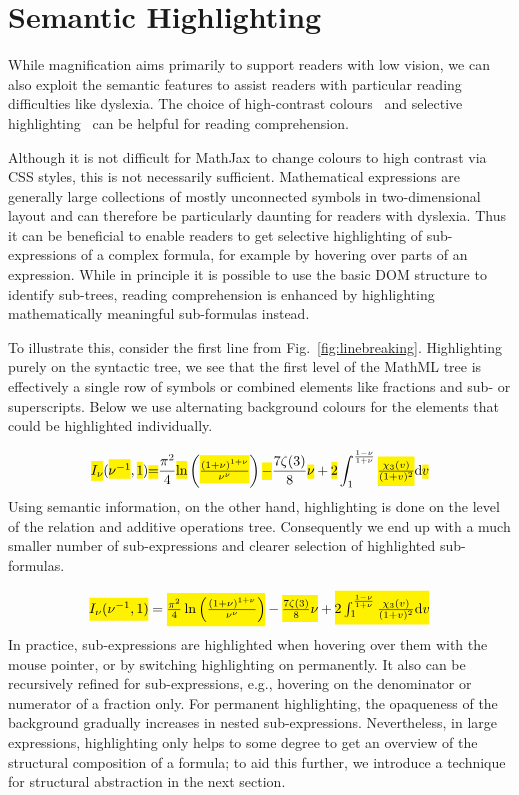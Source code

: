 \documentclass[conference]{IEEEtran}
\begin{document}
\section{Semantic Highlighting}
\label{sec:highlighting}

While magnification aims primarily to support readers with low vision, we can
also exploit the semantic features to assist readers with
particular reading difficulties like dyslexia. The choice of high-contrast
colours~\cite{rello2012optimal} and selective
highlighting~\cite{jones2008strategies} can be helpful for reading
comprehension.

Although it is not difficult for MathJax to change colours to high contrast via
CSS styles, this is not necessarily sufficient.  Mathematical expressions are
generally large collections of mostly unconnected symbols in two-dimensional
layout and can therefore be particularly daunting for readers with dyslexia.
Thus it can be beneficial to enable readers to get selective highlighting of
sub-expressions of a complex formula, for example by hovering over parts of an
expression.  While in principle it is possible to use the basic DOM 
structure to identify sub-trees, reading comprehension is enhanced by 
highlighting mathematically meaningful sub-formulas instead.

To illustrate this, consider the first line from Fig.~\ref{fig:linebreaking}.
Highlighting purely on the syntactic
tree, we see that the first level of the MathML tree is effectively a single
row of symbols or combined elements like fractions and sub- or
superscripts. Below we use alternating background colours for the elements
that could be highlighted individually.

\def\cb#1{\colorbox{yellow}{\ensuremath{\!\!#1\!\!}}}
\def\wcb#1{\colorbox{white}{\ensuremath{\!\!#1\!\!}}}
{\footnotesize
\[\cb{I_\nu}
  (
  \cb{\nu^{-1}}
  ,
  \cb{1}
  )
  \cb{=}
  \frac{\pi^2}{4}
  \cb{\ln}
  \left(
    \cb{\frac{(1+\nu)^{1+\nu}}{\nu^\nu}}
  \right)
  \cb{-}
  \frac{7\zeta(3)}{8}
  \cb{\nu}
  +
  \cb{2}
  \int^\frac{1-\nu}{1+\nu}_1
  \cb{\frac{\chi_3(v)}{(1+v)^2}}
  {\rm d}
  \cb{v}
\]
}%
%
Using semantic information, on the other hand, highlighting is done on the
level of the relation and additive operations tree. Consequently we end up with a
much smaller number of sub-expressions and clearer selection of highlighted
sub-formulas.

{\footnotesize
\[\cb{I_\nu(\nu^{-1},1)}
  =\cb{\frac{\pi^2}{4}\ln\left(\frac{(1+\nu)^{1+\nu}}{\nu^\nu}
\right)}-\cb{\frac{7\zeta(3)}{8}\nu}+
\cb{2\int^\frac{1-\nu}{1+\nu}_1\frac{\chi_3(v)}{(1+v)^2}{\rm d}v}
\]
}%
%
In practice, sub-expressions are highlighted when hovering over them with the
mouse pointer, or by switching highlighting on permanently. It also can be
recursively refined for sub-expressions, e.g., hovering on the denominator or
numerator of a fraction only. For permanent highlighting, the 
opaqueness of the background gradually increases in
nested sub-expressions. Nevertheless, in large expressions, highlighting only helps to
some degree to get an overview of the structural composition of a formula; to
aid this further, we introduce a technique for structural abstraction in the next
section.
\end{document}
